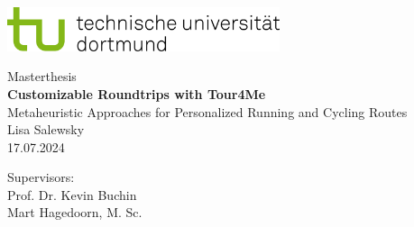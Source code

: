 \begin{titlepage}
\vspace*{-2cm}
\newlength{\links}
\setlength{\links}{-1.5cm}
\sffamily
\hspace*{\links}
\begin{minipage}{12.5cm}
\includegraphics[width=8cm]{bilder/tud_logo_rgb}
\end{minipage}

\vspace*{4cm}

\hspace*{\links}
\hspace*{-0.2cm}
\begin{minipage}{9cm}
\large
\begin{center}
{\Large Masterthesis} \\
\vspace*{1cm}
\textbf{Customizable Roundtrips with Tour4Me} \\
\normalsize{Metaheuristic Approaches for Personalized Running and Cycling Routes}\\
\vspace*{1cm}
\large{Lisa Salewsky\\
17.07.2024}
\end{center}
\end{minipage}
\normalsize
\vspace*{5.5cm}


\vspace*{2.1cm}

\hspace*{\links}
\begin{minipage}[b]{5cm}
\raggedright
Supervisors: \\
Prof. Dr. Kevin Buchin\\
Mart Hagedoorn, M. Sc. \\
\end{minipage}


\end{titlepage}
